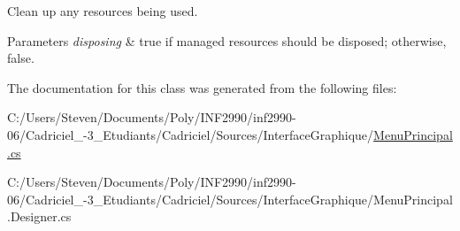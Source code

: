 Clean up any resources being used. 


\begin{DoxyParams}{Parameters}
{\em disposing} & true if managed resources should be disposed; otherwise, false.\\
\hline
\end{DoxyParams}


The documentation for this class was generated from the following files\+:\begin{DoxyCompactItemize}
\item 
C\+:/\+Users/\+Steven/\+Documents/\+Poly/\+I\+N\+F2990/inf2990-\/06/\+Cadriciel\+\_-\/3\+\_\+\+Etudiants/\+Cadriciel/\+Sources/\+Interface\+Graphique/\hyperlink{_menu_principal_8cs}{Menu\+Principal.\+cs}\item 
C\+:/\+Users/\+Steven/\+Documents/\+Poly/\+I\+N\+F2990/inf2990-\/06/\+Cadriciel\+\_-\/3\+\_\+\+Etudiants/\+Cadriciel/\+Sources/\+Interface\+Graphique/Menu\+Principal.\+Designer.\+cs\end{DoxyCompactItemize}
